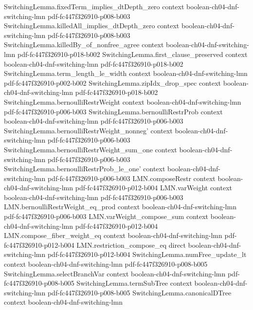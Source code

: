 \begin{theorem}
\proofstep
  {SwitchingLemma.fixedTerm_implies_dtDepth_zero}
  {context}
  {boolean-ch04-dnf-switching-lmn}
  {pdf-fc447f326910-p008-b003}
\proofstep
  {SwitchingLemma.killedAll_implies_dtDepth_zero}
  {context}
  {boolean-ch04-dnf-switching-lmn}
  {pdf-fc447f326910-p008-b003}
\proofstep
  {SwitchingLemma.killedBy_of_nonfree_agree}
  {context}
  {boolean-ch04-dnf-switching-lmn}
  {pdf-fc447f326910-p018-b002}
\proofstep
  {SwitchingLemma.first_clause_preserved}
  {context}
  {boolean-ch04-dnf-switching-lmn}
  {pdf-fc447f326910-p018-b002}
\proofstep
  {SwitchingLemma.term_length_le_width}
  {context}
  {boolean-ch04-dnf-switching-lmn}
  {pdf-fc447f326910-p002-b002}
\proofstep
  {SwitchingLemma.zipIdx_drop_spec}
  {context}
  {boolean-ch04-dnf-switching-lmn}
  {pdf-fc447f326910-p018-b002}
\proofstep
  {SwitchingLemma.bernoulliRestrWeight}
  {context}
  {boolean-ch04-dnf-switching-lmn}
  {pdf-fc447f326910-p006-b003}
\proofstep
  {SwitchingLemma.bernoulliRestrProb}
  {context}
  {boolean-ch04-dnf-switching-lmn}
  {pdf-fc447f326910-p006-b003}
\proofstep
  {SwitchingLemma.bernoulliRestrWeight_nonneg'}
  {context}
  {boolean-ch04-dnf-switching-lmn}
  {pdf-fc447f326910-p006-b003}
\proofstep
  {SwitchingLemma.bernoulliRestrWeight_sum_one}
  {context}
  {boolean-ch04-dnf-switching-lmn}
  {pdf-fc447f326910-p006-b003}
\proofstep
  {SwitchingLemma.bernoulliRestrProb_le_one'}
  {context}
  {boolean-ch04-dnf-switching-lmn}
  {pdf-fc447f326910-p006-b003}
\proofstep
  {LMN.composeRestr}
  {context}
  {boolean-ch04-dnf-switching-lmn}
  {pdf-fc447f326910-p012-b004}
\proofstep
  {LMN.varWeight}
  {context}
  {boolean-ch04-dnf-switching-lmn}
  {pdf-fc447f326910-p006-b003}
\proofstep
  {LMN.bernoulliRestrWeight_eq_prod}
  {context}
  {boolean-ch04-dnf-switching-lmn}
  {pdf-fc447f326910-p006-b003}
\proofstep
  {LMN.varWeight_compose_sum}
  {context}
  {boolean-ch04-dnf-switching-lmn}
  {pdf-fc447f326910-p012-b004}
\proofstep
  {LMN.compose_fiber_weight_eq}
  {context}
  {boolean-ch04-dnf-switching-lmn}
  {pdf-fc447f326910-p012-b004}
\proofstep
  {LMN.restriction_compose_eq}
  {direct}
  {boolean-ch04-dnf-switching-lmn}
  {pdf-fc447f326910-p012-b004}
\proofstep
  {SwitchingLemma.numFree_update_lt}
  {context}
  {boolean-ch04-dnf-switching-lmn}
  {pdf-fc447f326910-p008-b005}
\proofstep
  {SwitchingLemma.selectBranchVar}
  {context}
  {boolean-ch04-dnf-switching-lmn}
  {pdf-fc447f326910-p008-b005}
\proofstep
  {SwitchingLemma.termSubTree}
  {context}
  {boolean-ch04-dnf-switching-lmn}
  {pdf-fc447f326910-p008-b005}
\proofstep
  {SwitchingLemma.canonicalDTree}
  {context}
  {boolean-ch04-dnf-switching-lmn}

\end{theorem}
